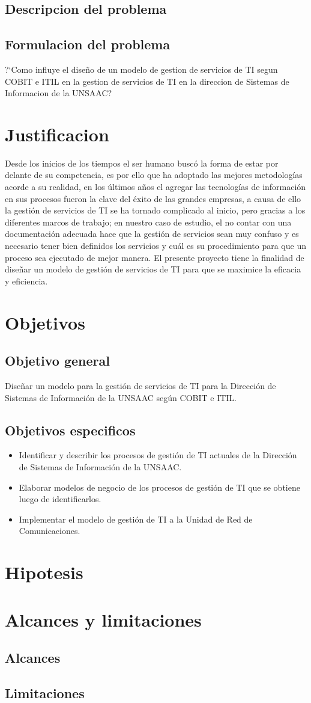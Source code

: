 \subsection{Descripcion del problema}
\subsection{Formulacion del problema}
?`Como influye el diseño de un modelo de gestion de servicios de TI segun COBIT e ITIL en la gestion de servicios de TI en la direccion de Sistemas de Informacion de la UNSAAC?
\section{Justificacion}
Desde los inicios de los tiempos el ser humano buscó la forma de estar por delante de su competencia, es por ello que ha adoptado las mejores metodologías acorde a su realidad, en los últimos años el agregar las tecnologías de información en sus procesos fueron la clave del éxito de las grandes empresas, a causa de ello la gestión de servicios de TI se ha tornado complicado al inicio, pero gracias a los diferentes marcos de trabajo; en nuestro caso de estudio, el no contar con una documentación adecuada hace que la gestión de servicios sean muy confuso y es necesario tener bien definidos los servicios y cuál es su procedimiento para que un proceso sea ejecutado de mejor manera.
El presente proyecto tiene la finalidad de diseñar un modelo de gestión de servicios de TI para que se maximice la eficacia y eficiencia.

\section{Objetivos}
\subsection{Objetivo general}
Diseñar un modelo para la gestión de servicios de TI para la Dirección de Sistemas de Información de la UNSAAC según COBIT e ITIL.
\subsection{Objetivos especificos}
\begin{itemize}
\item Identificar y describir los procesos de gestión de TI actuales de la Dirección de Sistemas de Información de la UNSAAC.
\item Elaborar modelos de negocio de los procesos de gestión de TI que se obtiene luego de identificarlos.
\item Implementar el modelo de gestión de TI a la Unidad de Red de Comunicaciones.
\end{itemize}
\section{Hipotesis}
\section{Alcances y limitaciones}
\subsection{Alcances}
\subsection{Limitaciones}
